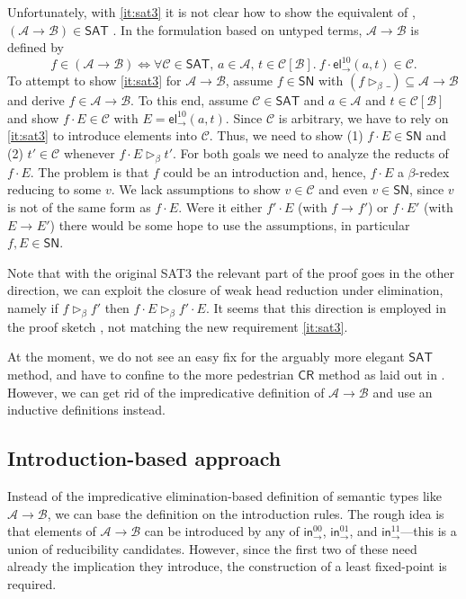 \documentclass[a4paper,USenglish,cleveref, autoref, thm-restate]{lipics-v2019}
\newcommand{\tin}{\ensuremath{\mathsf{in}}}
\newcommand{\inn}[2]{\ensuremath{\tin_{#1}^{#2}}}
\newcommand{\tel}{\mathsf{el}}
\newcommand{\el}[2]{\ensuremath{\tel_{#1}^{#2}}}
\newcommand{\whd}[1][]{\rhd_{#1}}
\newcommand{\red}[1][]{\longrightarrow_{#1}}
\newcommand{\CR}{\mathsf{CR}}
\newcommand{\A}{\mathcal{A}}
\newcommand{\B}{\mathcal{B}}
\newcommand{\C}{\mathcal{C}}
\newcommand{\SN}{\mathsf{SN}}
\newcommand{\SAT}{\mathsf{SAT}}
\begin{document}
Unfortunately, with \ref{it:sat3} it is not clear how to show the equivalent of
, $(\A \to \B) \in \SAT$ \cite[Lemma~58]{geuversHurkens:types17}.
In the formulation based on untyped terms, $\A \to \B$ is defined by
\[
  f \in (\A \to \B)
  \iff
  \forall \C \in \SAT, \,
  a \in \A, \,
  t \in \C[\B].\
  f \cdot \el\to{10}(a,t) \in \C .
\]
To attempt to show \ref{it:sat3} for $\A \to \B$, assume $f \in \SN$ with
$(f \whd[\beta]\_) \subseteq \A \to \B$ and derive $f \in \A \to \B$.
To this end, assume $\C \in \SAT$ and $a \in \A$ and $t \in \C[\B]$
and show $f \cdot E \in \C$ with $E = \el\to{10}(a,t)$.  Since $\C$ is
arbitrary, we have to rely on \ref{it:sat3} to introduce elements into
$\C$.  Thus, we need to show (1) $f \cdot E \in \SN$ and (2)
$t' \in \C$ whenever $f \cdot E \whd[\beta] t'$.  For both goals we need to
analyze the reducts of $f \cdot E$.  The problem is that $f$ could be
an introduction and, hence, $f \cdot E$ a $\beta$-redex reducing to
some $v$.  We lack assumptions to show $v \in \C$ and even $v \in
\SN$, since $v$ is not of the same form as $f \cdot E$.  Were it either
$f' \cdot E$ (with $f \red f'$) or $f \cdot E'$ (with $E \red E'$)
there would be some hope to use the assumptions, in particular $f,E \in \SN$.

Note that with the original SAT3 the relevant part of the proof goes
in the other direction, we can exploit the closure of weak head
reduction under elimination, namely if $f \whd[\beta] f'$
then $f \cdot E \whd[\beta] f' \cdot E$.  It seems that this direction
is employed in the proof sketch
\cite[Lemma~58.c]{geuversHurkens:types17}, not matching the new
requirement \ref{it:sat3}.

At the moment, we do not see an easy fix for the arguably more elegant
$\SAT$ method, and have to confine to the more pedestrian $\CR$ method
as laid out in \Cref{sec:elimbased}.  However, we can get rid of the
impredicative definition of $\A \to \B$ and use an inductive
definitions instead.


\subsection{Introduction-based approach}
\label{sec:introbased}

Instead of the impredicative elimination-based definition of semantic
types like $\A \to \B$, we can base the definition on the introduction
rules.  The rough idea is that elements of $\A \to \B$ can be
introduced by any of $\inn\to{00}$, $\inn\to{01}$, and
$\inn\to{11}$---this is a union of reducibility candidates.
However, since the first two of these need already the implication
they introduce, the construction of a least fixed-point is required.
\end{document}
